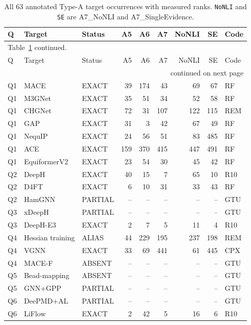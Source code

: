 \documentclass[11pt,a4paper]{article}
\begin{document}
{\footnotesize
\begin{longtable}{@{}lp{3.0cm}lrrrrrl@{}}
\caption{All 63 annotated Type-A target occurrences with measured ranks. \texttt{NoNLI} and \texttt{SE} are A7\_NoNLI and A7\_SingleEvidence.}\label{tab:perq}\\
\toprule
Q & Target & Status & A5 & A6 & A7 & NoNLI & SE & Code \\
\midrule
\endfirsthead
\multicolumn{9}{l}{\footnotesize Table~\ref{tab:perq} continued.}\\
\toprule
Q & Target & Status & A5 & A6 & A7 & NoNLI & SE & Code \\
\midrule
\endhead
\midrule
\multicolumn{9}{r}{\footnotesize continued on next page}\\
\endfoot
\bottomrule
\endlastfoot
Q1 & MACE & EXACT & 39 & 174 & 43 & 69 & 67 & RF \\
Q1 & M3GNet & EXACT & 35 & 51 & 34 & 52 & 58 & RF \\
Q1 & CHGNet & EXACT & 72 & 31 & 107 & 122 & 115 & REM \\
Q1 & GAP & EXACT & 31 & 3 & 42 & 67 & 49 & RF \\
Q1 & NequIP & EXACT & 24 & 56 & 51 & 83 & 485 & RF \\
Q1 & ACE & EXACT & 159 & 370 & 415 & 447 & 491 & RF \\
Q1 & EquiformerV2 & EXACT & 23 & 54 & 30 & 45 & 42 & RF \\
Q2 & DeepH & EXACT & 40 & 15 & 7 & 65 & 10 & R10 \\
Q2 & D4FT & EXACT & 6 & 10 & 31 & 33 & 43 & RF \\
Q2 & HamGNN & PARTIAL & -- & -- & -- & -- & -- & GTU \\
Q3 & xDeepH & PARTIAL & -- & -- & -- & -- & -- & GTU \\
Q3 & DeepH-E3 & EXACT & 2 & 7 & 5 & 11 & 4 & R10 \\
Q4 & Hessian training & ALIAS & 44 & 229 & 195 & 237 & 198 & REM \\
Q4 & VGNN & EXACT & 33 & 69 & 441 & 61 & 445 & CPX \\
Q4 & MACE-F & ABSENT & -- & -- & -- & -- & -- & GTU \\
Q5 & Bead-mapping & ABSENT & -- & -- & -- & -- & -- & GTU \\
Q5 & GNN+GPP & PARTIAL & -- & -- & -- & -- & -- & GTU \\
Q6 & DeePMD+AL & PARTIAL & -- & -- & -- & -- & -- & GTU \\
Q6 & LiFlow & EXACT & 2 & 42 & 5 & 16 & 6 & R10 \\

\end{longtable}}
\end{document}
